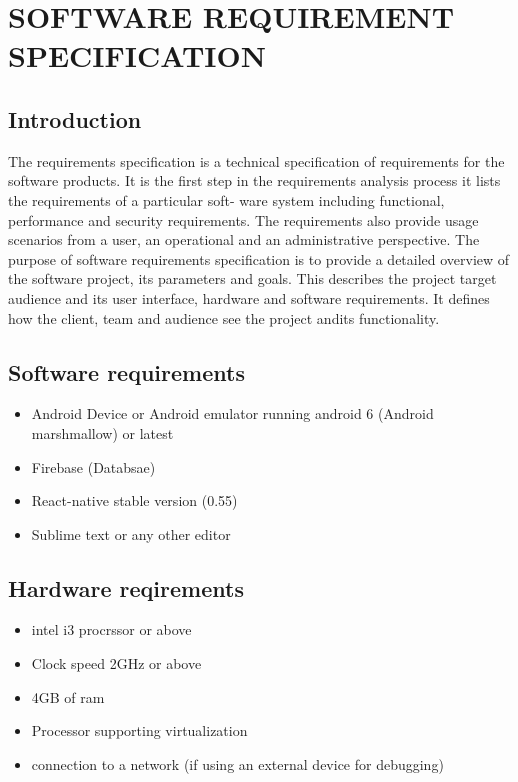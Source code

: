 \chapter{SOFTWARE REQUIREMENT SPECIFICATION}
\section{Introduction}
The requirements specification is a technical specification of requirements for the software products. It is the first step in the requirements analysis process it lists the requirements of a particular soft- ware system including functional, performance and security requirements. The requirements also provide usage scenarios from a user, an operational and an administrative perspective. The purpose of software requirements specification is to provide a detailed overview of the software project, its parameters and goals. This describes the project target audience and its user interface, hardware and software requirements.  It defines how the client, team and audience see the project andits functionality.


\section{Software requirements}
\begin{itemize}
	\item Android Device or Android emulator running android 6 (Android marshmallow) or latest
	\item Firebase (Databsae)
	\item React-native stable version (0.55)
	\item Sublime text or any other editor 
\end{itemize}
	
	
\section{Hardware reqirements}
\begin{itemize}
	\item intel i3 procrssor or above
	\item Clock speed 2GHz or above
	\item 4GB of ram
	\item Processor supporting virtualization
	\item connection to a network (if using an external device for debugging)
	
\end{itemize}
\newpage
